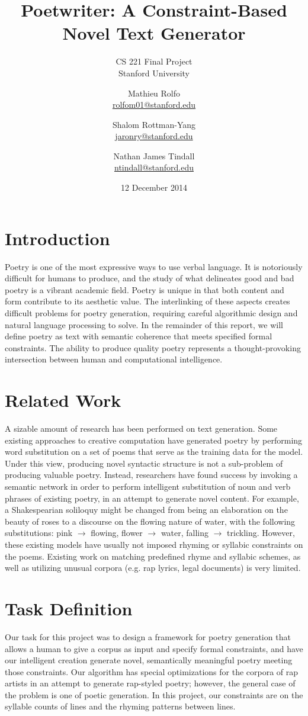 \documentclass[10pt,twocolumn]{article}
\title{Poetwriter: A Constraint-Based Novel Text Generator}
\subtitle{
	CS 221 Final Project\\
	Stanford University
	}
\author{
	Mathieu Rolfo\\
	\href{mailto:rolfom01@stanford.edu}{rolfom01@stanford.edu}
  \and
  	Shalom Rottman-Yang\\
	\href{mailto:jaronry@stanford.edu}{jaronry@stanford.edu}
  \and
  	Nathan James Tindall\\
	\href{mailto:ntindall@stanford.edu}{ntindall@stanford.edu}
}
\date{12 December 2014}
\begin{document}
\maketitle

\section{Introduction}
Poetry is one of the most expressive ways to use verbal language. It is notoriously difficult for humans to produce, and the study of what delineates good and bad poetry is a vibrant academic field. Poetry is unique in that both content and form contribute to its aesthetic value. The interlinking of these aspects creates difficult problems for poetry generation, requiring careful algorithmic design and natural language processing to solve. In the remainder of this report, we will define poetry as text with semantic coherence that meets specified formal constraints. The ability to produce quality poetry represents a thought-provoking intersection between human and computational intelligence.

\section{Related Work}
A sizable amount of research has been performed on text generation. Some existing approaches to creative computation have generated poetry by performing word substitution on a set of poems that serve as the training data for the model. Under this view, producing novel syntactic structure is not a sub-problem of producing valuable poetry. Instead, researchers have found success by invoking a semantic network in order to perform intelligent substitution of noun and verb phrases of existing poetry, in an attempt to generate novel content. For example, a Shakespearian soliloquy might be changed from being an elaboration on the beauty of roses to a discourse on the flowing nature of water, with the following substitutions: pink $\rightarrow$ flowing, flower $\rightarrow$ water, falling $\rightarrow$ trickling. However, these existing models have usually not imposed rhyming or syllabic constraints on the poems. Existing work on matching predefined rhyme and syllabic schemes, as well as utilizing unusual corpora (e.g. rap lyrics, legal documents) is very limited.

\section{Task Definition}
Our task for this project was to design a framework for poetry generation that allows a human to give a corpus as input and specify formal constraints, and have our intelligent creation generate novel, semantically meaningful poetry meeting those constraints. Our algorithm has special optimizations for the corpora of rap artists in an attempt to generate rap-styled poetry; however, the general case of the problem is one of poetic generation. In this project, our constraints are on the syllable counts of lines and the rhyming patterns between lines. 
\end{document}
